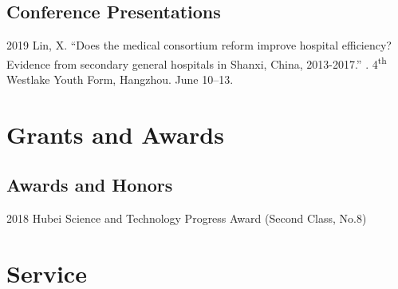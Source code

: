 \documentclass[12pt,letterpaper]{report}
\begin{document}
    \subsection*{Conference Presentations}
		\begin{tablist}
		
        \item[2019] \tab Lin, X. \enquote{Does the medical consortium reform improve hospital efficiency? Evidence from secondary general hospitals in Shanxi, China, 2013-2017.} . 4\textsuperscript{th} Westlake Youth Form, Hangzhou. June 10--13. 
            
    	\end{tablist}


    \section*{Grants and Awards}

    \subsection*{Awards and Honors}

    \begin{tablist}
      
        \item[2018] \tab Hubei Science and Technology Progress Award (Second Class, No.8)

     \end{tablist}



        

   
    \section*{Service}
\end{document}
